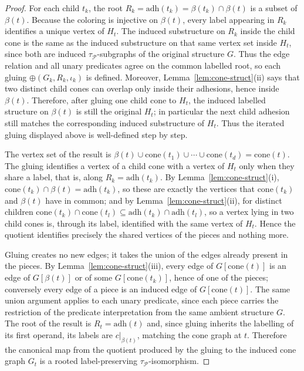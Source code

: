 \documentclass[11pt]{article}
\theoremstyle{definition}
\newcommand{\adh}{\mathrm{adh}}
\newcommand{\cone}{\mathrm{cone}}
\newcommand{\Pred}{\mathcal P}
\begin{document}
\begin{proof}
For each child \(t_k\), the root \(R_k=\adh(t_k)=\beta(t_k)\cap\beta(t)\) is a
subset of \(\beta(t)\).  Because the coloring is injective on \(\beta(t)\), every
label appearing in \(R_k\) identifies a unique vertex of \(H_t\).  The induced
substructure on \(R_k\) inside the child cone is the same as the induced
substructure on that same vertex set inside \(H_t\), since both are induced
\(\tau_{\Pred}\)-subgraphs of the original structure \(G\).  Thus the edge
relation and all unary predicates agree on the common labelled root, so each
gluing \(\oplus(G_k,R_k,\iota_k)\) is defined.  Moreover,
Lemma~\ref{lem:cone-struct}(ii) says that two distinct child cones can overlap
only inside their adhesions, hence inside \(\beta(t)\).  Therefore, after gluing
one child cone to \(H_t\), the induced labelled structure on \(\beta(t)\) is still
the original \(H_t\); in particular the next child adhesion still matches the
corresponding induced substructure of \(H_t\).  Thus the iterated gluing displayed
above is well-defined step by step.

The vertex set of the result is
\(\beta(t)\cup\cone(t_1)\cup\cdots\cup\cone(t_d)=\cone(t)\).  The gluing identifies
a vertex of a child cone with a vertex of \(H_t\) only when they share a label,
that is, along \(R_k=\adh(t_k)\).  By Lemma~\ref{lem:cone-struct}(i),
\(\cone(t_k)\cap\beta(t)=\adh(t_k)\), so these are exactly the vertices that
\(\cone(t_k)\) and \(\beta(t)\) have in common; and by
Lemma~\ref{lem:cone-struct}(ii), for distinct children
\(\cone(t_k)\cap\cone(t_l)\subseteq\adh(t_k)\cap\adh(t_l)\), so a vertex lying in
two child cones is, through its label, identified with the same vertex of
\(H_t\).  Hence the quotient identifies precisely the shared vertices of the
pieces and nothing more.

Gluing creates no new edges; it takes the union of the edges already present in
the pieces.  By Lemma~\ref{lem:cone-struct}(iii), every edge of \(G[\cone(t)]\) is
an edge of \(G[\beta(t)]\) or of some \(G[\cone(t_k)]\), hence of one of the
pieces; conversely every edge of a piece is an induced edge of \(G[\cone(t)]\).
The same union argument applies to each unary predicate, since each piece carries
the restriction of the predicate interpretation from the same ambient structure
\(G\).  The root of the result is \(R_t=\adh(t)\) and, since gluing inherits the
labelling of its first operand, its labels are \(c|_{\beta(t)}\), matching the
cone graph at \(t\).  Therefore the canonical map from the quotient produced by
the gluing to the induced cone graph \(G_t\) is a rooted label-preserving
\(\tau_{\Pred}\)-isomorphism.
\end{proof}
\end{document}
